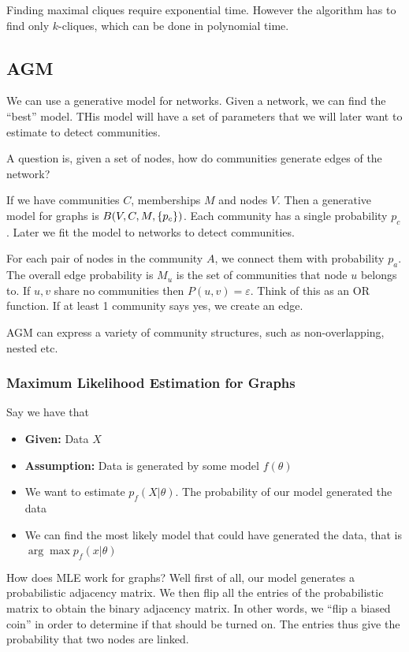 Finding maximal cliques require exponential time. However the algorithm has to find only $k$-cliques, which can be done in polynomial time. 

\subsection{AGM}
    We can use a generative model for networks. Given a network, we can find the ``best'' model.  THis model will have a set of parameters that we will later want to estimate to detect communities.
    
    A question is, given a set of nodes, how do communities generate edges of the network? 
    
    If we have communities $C$, memberships $M$ and nodes $V$. Then a generative model for graphs is $B(V, C, M, \{p_c\})$. Each community has a single probability $p_c$. Later we fit the model to networks to detect communities. 
    
    For each pair of nodes in the community $A$, we connect them with probability $p_a$. The overall edge probability is
    $M_u$ is the set of communities that node $u$ belongs to. If $u, v$ share no communities then $P(u, v) = \varepsilon$. Think of this as an OR function. If at least 1 community says yes, we create an edge.
    
    AGM can express a variety of community structures, such as non-overlapping, nested etc. 
    
\subsubsection{Maximum Likelihood Estimation for Graphs}
    Say we have that
    \begin{itemize}
        \item \textbf{Given:} Data $X$
        \item \textbf{Assumption:} Data is generated by some model $f(\theta)$
        \item We want to estimate $p_f(X | \theta)$. The probability of our model generated the data
        \item We can find the most likely model that could have generated the data, that is $\arg \max p_f(x | \theta)$
    \end{itemize}
    
    How does MLE work for graphs? Well first of all, our model generates a probabilistic adjacency matrix. We then flip all the entries of the probabilistic matrix to obtain the binary adjacency matrix. In other words, we ``flip a biased coin'' in order to determine if that should be turned on. The entries thus give the probability that two nodes are linked.
    
